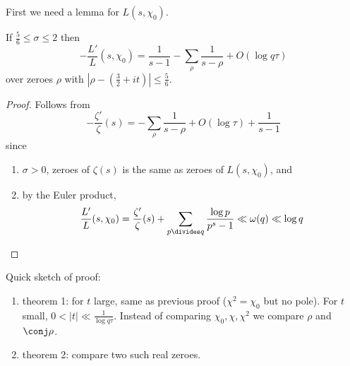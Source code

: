 \documentclass[a4paper]{article}
\theoremstyle{definition}
\begin{document}
First we need a lemma for \(L(s, \chi_0)\).
\begin{lemma}
  If \(\frac{5}{6} \leq \sigma \leq 2\) then
  \[
    -\frac{L'}{L}(s, \chi_0) = \frac{1}{s - 1} - \sum_\rho \frac{1}{s - \rho} + O(\log q \tau)
  \]
  over zeroes \(\rho\) with \(|\rho - (\frac{3}{2} + it)| \leq \frac{5}{6}\).
\end{lemma}

\begin{proof}
  Follows from
  \[
    -\frac{\zeta'}{\zeta}(s) = - \sum_\rho \frac{1}{s - \rho} + O(\log \tau) + \frac{1}{s - 1}
  \]
  since
  \begin{enumerate}
  \item \(\sigma > 0\), zeroes of \(\zeta(s)\) is the same as zeroes of \(L(s, \chi_0)\), and
  \item by the Euler product,
    \[
      \frac{L'}{L}(s, \chi_0)
      = \frac{\zeta'}{\zeta}(s) + \sum_{p \divides q} \frac{\log p}{p^s - 1}
      \ll \omega(q)
      \ll \log q
    \]
  \end{enumerate}
\end{proof}

Quick sketch of proof:
\begin{enumerate}
\item theorem 1: for \(t\) large, same as previous proof (\(\chi^2 = \chi_0\) but no pole). For \(t\) small, \(0 < |t| \ll \frac{1}{\log q\tau}\). Instead of comparing \(\chi_0, \chi, \chi^2\) we compare \(\rho\) and \(\conj \rho\).
\item theorem 2: compare two such real zeroes.
\end{enumerate}












\printindex
\end{document}
